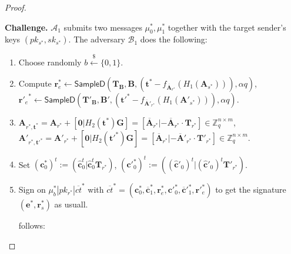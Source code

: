 \documentclass[a4paper,11pt,onecolumn]{elsarticle}
\begin{document}
\begin{proof}
\begin{description}
	\textbf{Challenge.} $\mathcal{A}_1$ submits two messages $\mu^*_0, \mu^*_1$ together with the target sender's keys $(pk_{s^*},sk_{s^*})$. The adversary $\mathcal{B}_1$ does the following:
		\begin{enumerate}
	\item Choose randomly $b \xleftarrow{\$} \{0,1\}$.
	\item Compute $\textbf{r}_e^* \leftarrow \textsf{SampleD}(\textbf{T}_\textbf{B}, \textbf{B}, (\textbf{t}^*-f_{\overline{\textbf{A}}_{r^*}}(H_1(\textbf{A}_{s^*}))),\alpha q)$,  ${\textbf{r}'_e}^* \leftarrow \textsf{SampleD}(\textbf{T}'_\textbf{B}, \textbf{B}', (\textbf{t}'^*-f_{\overline{\textbf{A}}'_{r^*}}(H_1(\textbf{A}'_{s^*}))),\alpha q)$.  
	\item $\mathbf{A}_{r^*,\textbf{t}^*}=\mathbf{A}_{r^*}+[\textbf{0}|H_2(\textbf{t}^*)\mathbf{G}]=[\overline{\mathbf{A}}_{r^*}|-\overline{\mathbf{A}}_{r^*}\cdot \mathbf{T}_{r^*}] \in \mathbb{Z}_q^{n \times m}$,\\ $\mathbf{A}'_{r^*,\textbf{t}'^*}=\mathbf{A}'_{r^*}+[\textbf{0}|H_2(\textbf{t}'^*)\mathbf{G}]=[\overline{\mathbf{A}}_{r^*}|-\overline{\mathbf{A}}'_{r^*}\cdot \mathbf{T}'_{r^*}] \in \mathbb{Z}_q^{n \times m}$.
	\item Set  ${(\textbf{c}^*_0)}^t:=(\hat{\textbf{c}}_0^t|\hat{\textbf{c}}_0^t\textbf{T}_{r^*})$, \quad  ${(\textbf{c}'^*_0)}^t:=((\hat{\textbf{c}}'_0)^t|(\hat{\textbf{c}}'_0)^t\textbf{T}'_{r^*})$.

	\item Sign on $\mu^*_b| pk_{r^*}|\overline{ct}^*$ with $\overline{ct}^*=(\textbf{c}^*_0, \overline{\textbf{c}}^*_1, \textbf{r}^*_e, \textbf{c}'^*_0, \overline{\textbf{c}}'^*_1, \textbf{r}'^*_e)$ to get the signature $(\textbf{e}^*, \textbf{r}_s^*)$ as usuall. 
	
	\iffalse  follows:					
					\begin{enumerate}
					

\end{enumerate}
\end{enumerate}
\end{description}
\end{proof}
\end{document}
